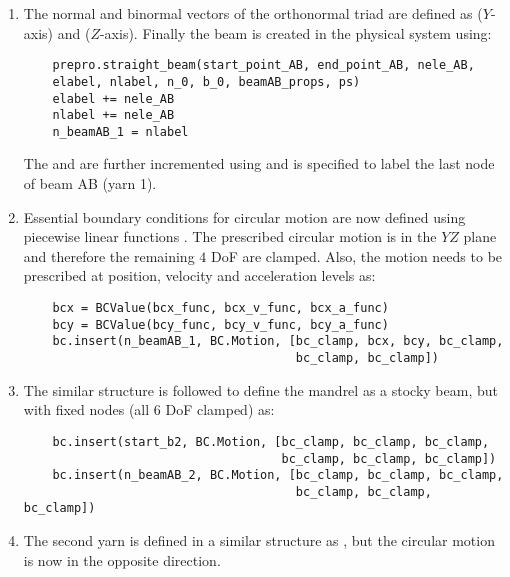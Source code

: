 \begin{enumerate}
    \item The normal and binormal vectors of the orthonormal triad are defined as  ($Y$-axis) and  ($Z$-axis). Finally the beam is created in the physical system using:
    \pythonstyle
    \begin{tcolorbox}\begin{lstlisting}
    prepro.straight_beam(start_point_AB, end_point_AB, nele_AB, 
    elabel, nlabel, n_0, b_0, beamAB_props, ps)
    elabel += nele_AB 
    nlabel += nele_AB 
    n_beamAB_1 = nlabel
    \end{lstlisting}\end{tcolorbox}
        The  and  are further incremented using  and  is specified to label the last node of beam AB (yarn 1).
    \item Essential boundary conditions for circular motion are now defined using piecewise linear functions . The prescribed circular motion is in the $YZ$ plane and therefore the remaining $4$ DoF are clamped. Also, the motion needs to be prescribed at position, velocity and acceleration levels as:
    \pythonstyle
    \begin{tcolorbox}\begin{lstlisting}
    bcx = BCValue(bcx_func, bcx_v_func, bcx_a_func)
    bcy = BCValue(bcy_func, bcy_v_func, bcy_a_func)
    bc.insert(n_beamAB_1, BC.Motion, [bc_clamp, bcx, bcy, bc_clamp, 
                                      bc_clamp, bc_clamp])
    \end{lstlisting}\end{tcolorbox}
    \item The similar structure is followed to define the mandrel as a stocky beam, but with fixed nodes (all $6$ DoF clamped) as:
    \pythonstyle
    \begin{tcolorbox}\begin{lstlisting}
    bc.insert(start_b2, BC.Motion, [bc_clamp, bc_clamp, bc_clamp, 
                                    bc_clamp, bc_clamp, bc_clamp])
    bc.insert(n_beamAB_2, BC.Motion, [bc_clamp, bc_clamp, bc_clamp, 
                                      bc_clamp, bc_clamp, bc_clamp])
    \end{lstlisting}\end{tcolorbox}
    \item The second yarn is defined in a similar structure as , but the circular motion is now in the opposite direction.

\end{enumerate}
